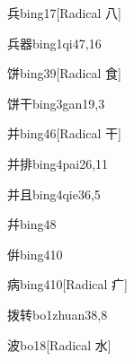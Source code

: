 \begin{verbete}{兵}{bing1}{7}[Radical 八]
\end{verbete}

\begin{verbete}{兵器}{bing1qi4}{7,16}
\end{verbete}

\begin{verbete}{饼}{bing3}{9}[Radical 食]
\end{verbete}

\begin{verbete}{饼干}{bing3gan1}{9,3}
\end{verbete}

\begin{verbete}{并}{bing4}{6}[Radical 干]
\end{verbete}

\begin{verbete}{并排}{bing4pai2}{6,11}
\end{verbete}

\begin{verbete}{并且}{bing4qie3}{6,5}
\end{verbete}

\begin{verbete}{幷}{bing4}{8}
\end{verbete}

\begin{verbete}{倂}{bing4}{10}
\end{verbete}

\begin{verbete}{病}{bing4}{10}[Radical 疒]
\end{verbete}

\begin{verbete}{拨转}{bo1zhuan3}{8,8}
\end{verbete}

\begin{verbete}{波}{bo1}{8}[Radical 水]
\end{verbete}

